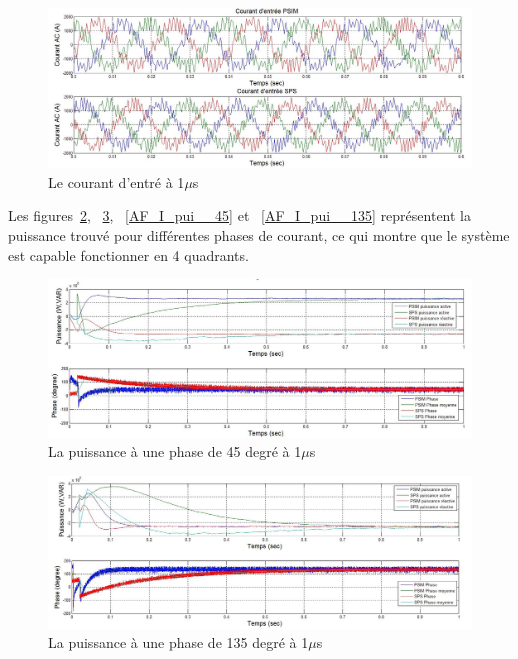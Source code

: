 \documentclass[11pt,letterpaper,final]{report}
\begin{document}
\begin{figure}[htb]
\centering
\includegraphics[scale=0.5]{Fig/AFEIDEAL/CourantAC.jpg}
\caption{Le courant d'entré à 1$\mu$s}
\label{AF_I_cou}
\end{figure}

Les figures~\ref{AF_I_pui_45}, ~\ref{AF_I_pui_135}, ~\ref{AF_I_pui__45} et ~\ref{AF_I_pui__135} représentent la puissance trouvé pour différentes phases de courant, ce qui montre que le système est capable fonctionner en 4 quadrants.

\begin{figure}[htb]
\centering
\includegraphics[scale=0.5]{Fig/AFEIDEAL/pui45.jpg}
\caption{La puissance à une phase de 45 degré à 1$\mu$s}
\label{AF_I_pui_45}
\end{figure}

\begin{figure}[htb]
\centering
\includegraphics[scale=0.5]{Fig/AFEIDEAL/pui135.jpg}
\caption{La puissance à une phase de 135 degré à 1$\mu$s}
\label{AF_I_pui_135}
\end{figure}
\end{document}
